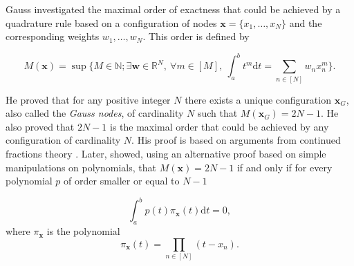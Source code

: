 \documentclass[twoside,11pt]{book}
\numberwithin{theorem}{chapter}
\numberwithin{definition}{chapter}
\numberwithin{proposition}{chapter}
\numberwithin{corollary}{chapter}
\numberwithin{example}{chapter}
\numberwithin{lemma}{chapter}
\begin{document}
 Gauss investigated the maximal order of exactness that could be achieved by a quadrature rule based on a configuration of nodes $\bm{x} = \{ x_{1}, \dots, x_{N} \}$ and the corresponding weights $w_{1}, \dots, w_{N}$. This order is defined by 

\begin{equation}
M(\bm{x}) = \sup \bigg\{ M \in \mathbb{N}; \exists \bm{w} \in \mathbb{R}^{N}, \: \forall m \in [M], \: \int_{a}^{b} t^{m} \mathrm{d}t = \sum\limits_{n \in [N]} w_{n}x_{n}^{m} \bigg\}.
\end{equation}





He proved that for any positive integer $N$ there exists a unique configuration $\bm{x}_{G}$, also called the \emph{Gauss nodes}, of cardinality $N$ such that $M(\bm{x}_{G}) = 2N-1$. He also proved that $2N-1$ is the maximal order that could be achieved by any configuration of cardinality $N$. His proof \citep{Gau1815} is based on arguments from continued fractions theory \citep{Khi97}.
Later, \cite{Jac1826} showed, using an alternative proof based on simple manipulations on polynomials, that $M(\bm{x}) = 2N-1$ if and only if for every polynomial $p$ of order smaller or equal to $N-1$

\begin{equation}\label{eq:Legendre_orthogonality}
\int_{a}^{b} p(t) \pi_{\bm{x}}(t) \mathrm{d}t = 0,
\end{equation}
where $\pi_{\bm{x}}$ is the polynomial
\begin{equation}
\pi_{\bm{x}}(t) = \prod\limits_{n \in [N]}(t-x_{n}).
\end{equation}

\end{document}
